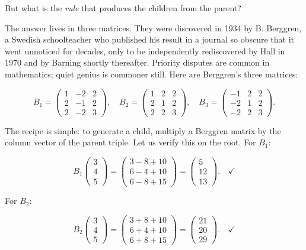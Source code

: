 \documentclass[12pt, letterpaper, openany]{book}
\theoremstyle{definition}
\theoremstyle{remark}
\begin{document}
But what is the \textit{rule} that produces the children from the parent?

The answer lives in three matrices. They were discovered in 1934 by B. Berggren, a Swedish schoolteacher who published his result in a journal so obscure that it went unnoticed for decades, only to be independently rediscovered by Hall in 1970 and by Barning shortly thereafter. Priority disputes are common in mathematics; quiet genius is commoner still. Here are Berggren's three matrices:

\[
B_1 = \begin{pmatrix} 1 & -2 & 2 \\ 2 & -1 & 2 \\ 2 & -2 & 3 \end{pmatrix}, \quad B_2 = \begin{pmatrix} 1 & 2 & 2 \\ 2 & 1 & 2 \\ 2 & 2 & 3 \end{pmatrix}, \quad B_3 = \begin{pmatrix} -1 & 2 & 2 \\ -2 & 1 & 2 \\ -2 & 2 & 3 \end{pmatrix}.
\]

The recipe is simple: to generate a child, multiply a Berggren matrix by the column vector of the parent triple. Let us verify this on the root. For $B_1$:

\[
B_1 \begin{pmatrix} 3 \\ 4 \\ 5 \end{pmatrix} = \begin{pmatrix} 3 - 8 + 10 \\ 6 - 4 + 10 \\ 6 - 8 + 15 \end{pmatrix} = \begin{pmatrix} 5 \\ 12 \\ 13 \end{pmatrix}. \quad \checkmark
\]

For $B_2$:

\[
B_2 \begin{pmatrix} 3 \\ 4 \\ 5 \end{pmatrix} = \begin{pmatrix} 3 + 8 + 10 \\ 6 + 4 + 10 \\ 6 + 8 + 15 \end{pmatrix} = \begin{pmatrix} 21 \\ 20 \\ 29 \end{pmatrix}. \quad \checkmark
\]
\end{document}
